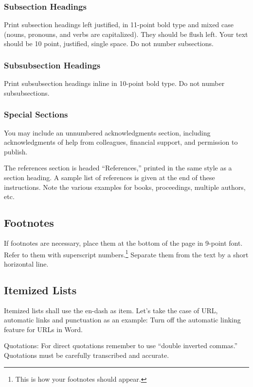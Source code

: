 \documentclass[letterpaper]{article}
\begin{document}
\subsubsection{Subsection Headings}

Print subsection headings left justified, in 11-point bold type and mixed case (nouns, pronouns, and verbs are capitalized). They should be flush left. Your text should be 10 point, justified, single space. Do not number subsections.

\subsubsection{Subsubsection Headings}

Print subsubsection headings inline in 10-point bold type. Do not number subsubsections.

\subsubsection{Special Sections}

You may include an unnumbered acknowledgments section, including acknowledgments of help from colleagues, financial support, and permission to publish.

The references section is headed ``References,'' printed in the same style as a section heading. A sample list of references is given at the end of these instructions.  Note the various examples for books, proceedings, multiple authors, etc. 

\subsection{Footnotes}

If footnotes are necessary, place them at the bottom of the page in 9-point font. Refer to them with superscript numbers.\footnote{This is how your footnotes should appear.} Separate them from the text by a short horizontal line. 

\subsection{Itemized Lists}

Itemized lists shall use the en-dash as item. Let’s take the case of URL, automatic links and punctuation as an example:
Turn off the automatic linking feature for URLs in Word.

Quotations: For direct quotations remember to use ``double inverted commas.'' Quotations must be carefully transcribed and accurate. 
\end{document}
